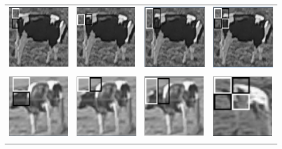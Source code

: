 \documentclass[11pt]{article}
\begin{document}
\begin{tabular}{llll}
\includegraphics[scale=0.75]{res/f1.png}
& 
\includegraphics[scale=0.75]{res/f2.png}
&
\includegraphics[scale=0.75]{res/f3.png}
& 
\includegraphics[scale=0.75]{res/f4.png}
\\
\\
\includegraphics[scale=0.75]{res/f5.png}
& 
\includegraphics[scale=0.75]{res/f6.png}
&
\includegraphics[scale=0.75]{res/f7.png}
& 
\includegraphics[scale=0.75]{res/f8.png}
\\
\label{best_features}
\end{tabular}
\end{document}
